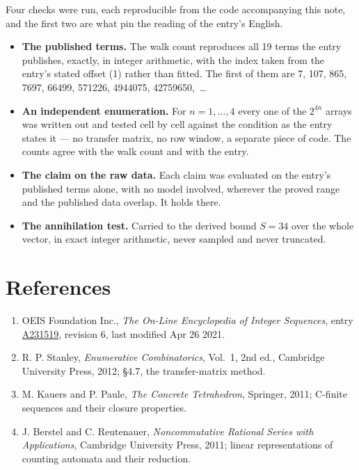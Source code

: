 \documentclass[11pt]{article}
\theoremstyle{definition}
\begin{document}
Four checks were run, each reproducible from the code accompanying this note, and the first two are what pin the reading of the entry's English.

\begin{itemize}

\item {\bfseries The published terms.} The walk count reproduces all 19 terms the entry publishes, exactly, in integer arithmetic, with the index taken from the entry's stated offset (1) rather than fitted. The first of them are 7, 107, 865, 7697, 66499, 571226, 4944075, 42759650,~\dots

\item {\bfseries An independent enumeration.} For $n = 1,\dots,4$ every one of the $2^{4n}$ arrays was written out and tested cell by cell against the condition as the entry states it --- no transfer matrix, no row window, a separate piece of code. The counts agree with the walk count and with the entry.

\item {\bfseries The claim on the raw data.} Each claim was evaluated on the entry's published terms alone, with no model involved, wherever the proved range and the published data overlap. It holds there.

\item {\bfseries The annihilation test.} Carried to the derived bound $S = 34$ over the whole vector, in exact integer arithmetic, never sampled and never truncated.

\end{itemize}

\section{References}

\begin{enumerate}

\item OEIS Foundation Inc., \emph{The On-Line Encyclopedia of Integer Sequences}, entry \href{https://oeis.org/A231519}{A231519}, revision 6, last modified Apr 26 2021.

\item R. P. Stanley, \emph{Enumerative Combinatorics}, Vol.~1, 2nd ed., Cambridge University Press, 2012; \S4.7, the transfer-matrix method.

\item M. Kauers and P. Paule, \emph{The Concrete Tetrahedron}, Springer, 2011; C-finite sequences and their closure properties.

\item J. Berstel and C. Reutenauer, \emph{Noncommutative Rational Series with Applications}, Cambridge University Press, 2011; linear representations of counting automata and their reduction.

\end{enumerate}
\end{document}
